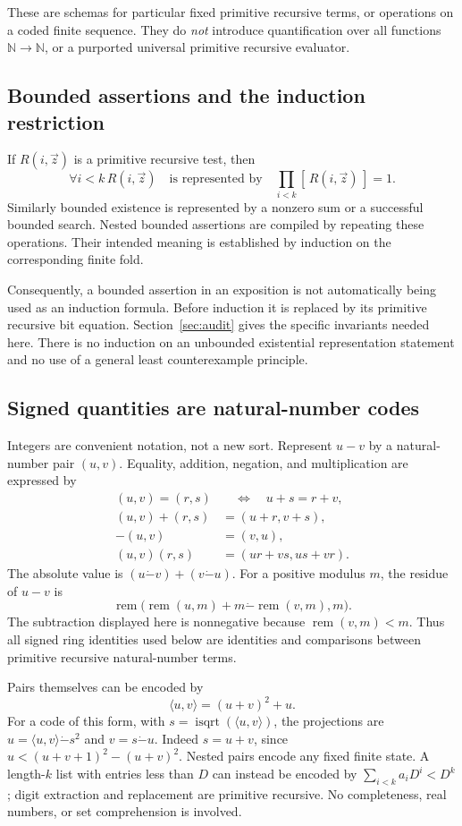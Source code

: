\documentclass[11pt,letterpaper]{article}
\theoremstyle{definition}
\theoremstyle{remark}
\newcommand{\N}{\mathbb N}
\newcommand{\sqroot}{\operatorname{isqrt}}
\newcommand{\remd}{\operatorname{rem}}
\newcommand{\ind}[1]{[\,#1\,]}
\newcommand{\monus}{\mathbin{\dot{-}}}
\begin{document}
These are schemas for particular fixed primitive recursive terms, or
operations on a coded finite sequence. They do \emph{not} introduce
quantification over all functions \(\N\to\N\), or a purported universal
primitive recursive evaluator.

\subsection{Bounded assertions and the induction restriction}

If \(R(i,\vec z)\) is a primitive recursive test, then
\[
 \forall i<k\,R(i,\vec z)
 \quad\text{is represented by}\quad
 \prod_{i<k}\ind{R(i,\vec z)}=1.
\]
Similarly bounded existence is represented by a nonzero sum or a
successful bounded search. Nested bounded assertions are compiled by
repeating these operations. Their intended meaning is established by
induction on the corresponding finite fold.

Consequently, a bounded assertion in an exposition is not automatically
being used as an induction formula. Before induction it is replaced by
its primitive recursive bit equation. Section~\ref{sec:audit} gives the
specific invariants needed here. There is no induction on an unbounded
existential representation statement and no use of a general least
counterexample principle.

\subsection{Signed quantities are natural-number codes}

Integers are convenient notation, not a new sort. Represent \(u-v\) by
a natural-number pair \((u,v)\). Equality, addition, negation, and
multiplication are expressed by
\[
\begin{split}
 (u,v)=(r,s)&\quad\Longleftrightarrow\quad u+s=r+v,\\
 (u,v)+(r,s)&=(u+r,v+s),\\
 -(u,v)&=(v,u),\\
 (u,v)(r,s)&=(ur+vs,us+vr).
\end{split}
\]
The absolute value is \((u\monus v)+(v\monus u)\).
For a positive modulus \(m\), the residue of \(u-v\) is
\[
 \remd\bigl(\remd(u,m)+m\monus\remd(v,m),m\bigr).
\]
The subtraction displayed here is nonnegative because
\(\remd(v,m)<m\). Thus all signed ring identities used below are identities
and comparisons between primitive recursive natural-number terms.

Pairs themselves can be encoded by
\[
 \langle u,v\rangle=(u+v)^2+u.
\]
For a code of this form, with \(s=\sqroot(\langle u,v\rangle)\), the
projections are \(u=\langle u,v\rangle\monus s^2\) and \(v=s\monus u\).
Indeed \(s=u+v\), since \(u<(u+v+1)^2-(u+v)^2\).
Nested pairs encode any fixed finite state. A length-\(k\) list with
entries less than \(D\) can instead be encoded by
\(\sum_{i<k}a_iD^i<D^k\); digit extraction and replacement are primitive
recursive. No completeness, real numbers, or set comprehension is involved.
\end{document}
